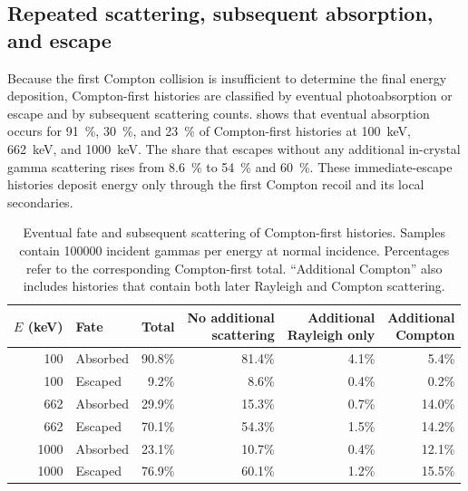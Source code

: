 \subsection{Repeated scattering, subsequent absorption, and escape}
\label{sec:cebr3-fates}

Because the first Compton collision is insufficient to determine the final energy deposition, Compton-first histories are classified by eventual photoabsorption or escape and by subsequent scattering counts.  shows that eventual absorption occurs for \qty{91}{\percent}, \qty{30}{\percent}, and \qty{23}{\percent} of Compton-first  histories at \qty{100}{\kilo\electronvolt}, \qty{662}{\kilo\electronvolt}, and \qty{1000}{\kilo\electronvolt}. The share that escapes without any additional in-crystal gamma scattering rises from \qty{8.6}{\percent} to \qty{54}{\percent} and \qty{60}{\percent}. These immediate-escape histories deposit energy only through the first Compton recoil and its local secondaries.

\begin{table}[htbp]
\centering\small
\caption{Eventual fate and subsequent scattering of Compton-first  histories. Samples contain \num{100000} incident gammas per energy at normal incidence. Percentages refer to the corresponding Compton-first total. ``Additional Compton'' also includes histories that contain both later Rayleigh and Compton scattering.}
\label{tab:cebr-multiplicity}
\begin{tabular}{rlrrrr}
\toprule
$E$ (\unit{\kilo\electronvolt}) & Fate & Total & \shortstack{No additional\\scattering} & \shortstack{Additional\\Rayleigh only} & \shortstack{Additional\\Compton} \\
\midrule
100 & Absorbed & 90.8\% & 81.4\% & 4.1\% & 5.4\% \\
100 & Escaped & 9.2\% & 8.6\% & 0.4\% & 0.2\% \\
662 & Absorbed & 29.9\% & 15.3\% & 0.7\% & 14.0\% \\
662 & Escaped & 70.1\% & 54.3\% & 1.5\% & 14.2\% \\
1000 & Absorbed & 23.1\% & 10.7\% & 0.4\% & 12.1\% \\
1000 & Escaped & 76.9\% & 60.1\% & 1.2\% & 15.5\% \\
\bottomrule
\end{tabular}
\end{table}

